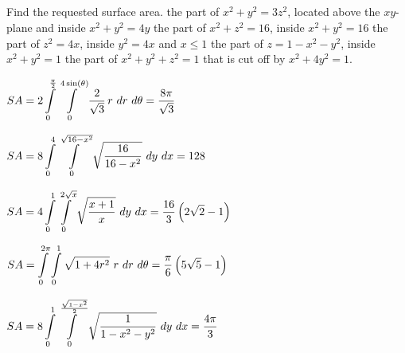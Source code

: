 \subsection*{} 
\begin{Exercise} Find the requested surface area.
    \Question[difficulty = 3] the part of $x^2+y^2 = 3z^2$, located above the $xy$-plane and inside $x^2+y^2=4y$
    \Question[difficulty = 2] the part of $x^2+z^2=16$, inside $x^2+y^2=16$
    \Question[difficulty = 3] the part of $z^2=4x$, inside $y^2=4x$ and $x \leq 1$
    \Question[difficulty = 3] the part of $z=1-x^2-y^2$, inside $x^2+y^2=1$
    \Question[difficulty = 2] the part of $x^2+y^2+z^2= 1$ that is cut off by $x^2+4y^2=1$.
\end{Exercise}

\begin{Answer}
    
    \Question $SA=2 \displaystyle \int\limits_0^{\frac{\pi}{2}} \int\limits_0^{4 \sin(\theta) } \dfrac{2}{\sqrt{3}} \, r \  dr \ d\theta = \dfrac{8 \pi}{\sqrt{3}}$
    
    \Question $SA=8 \displaystyle \int\limits_0^{4} \int\limits_0^{\sqrt{16-x^2}} \sqrt{\dfrac{16}{16-x^2}}  \  dy \ dx = 128 $
    
    \Question $SA=4 \displaystyle \int\limits_0^{1} \int\limits_0^{2\sqrt{x}} \sqrt{\dfrac{x+1}{x}}  \  dy \ dx = \dfrac{16}{3} \left(2 \sqrt{2}-1 \right) $
    
    \Question $SA= \displaystyle \int\limits_0^{2\pi} \int\limits_0^{1} \sqrt{1+4r^2} \ r \ dr \ d\theta = \dfrac{\pi}{6} \left(5\sqrt{5}-1 \right)$
    
    \Question $SA= 8 \ds \int\limits_0^{1} \int\limits_0^{\frac{\sqrt{1 - x^2}}{2}} \sqrt{ \dfrac{1}{1-x^2-y^2}} \ dy \ dx = \dfrac{4\pi}{3}$
    
\end{Answer}


